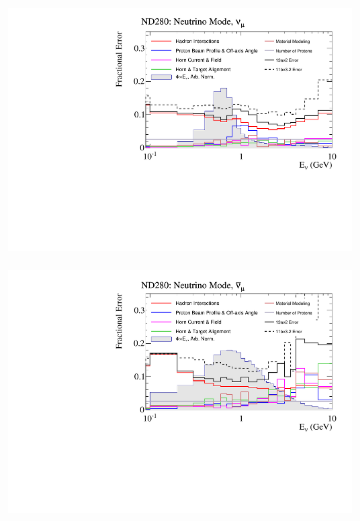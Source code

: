 \begin{figure}[h]
	\begin{subfigure}[t]{0.42\textwidth}
		\includegraphics[width=\textwidth, trim={0mm 0mm 0mm 0mm}, clip,page=1]{figures/flux/total_err_nd5_numode_numu}
	\end{subfigure}
	\begin{subfigure}[t]{0.42\textwidth}
		\includegraphics[width=\textwidth, trim={0mm 0mm 0mm 0mm}, clip,page=1]{figures/flux/total_err_nd5_numode_numub}
	\end{subfigure}


\end{figure}
